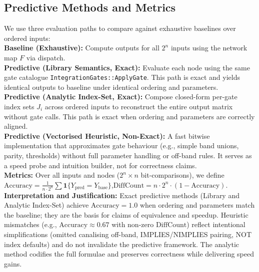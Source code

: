\documentclass{article}
\begin{document}
\subsection{Predictive Methods and Metrics}
We use three evaluation paths to compare against exhaustive baselines over ordered inputs:\\
\textbf{Baseline (Exhaustive):} Compute outputs for all \(2^n\) inputs using the network map \(F\) via dispatch.\\
\textbf{Predictive (Library Semantics, Exact):} Evaluate each node using the same gate catalogue \texttt{Integration\textasciigrave Gates::ApplyGate}. This path is exact and yields identical outputs to baseline under identical ordering and parameters.\\
\textbf{Predictive (Analytic Index-Set, Exact):} Compose closed-form per-gate index sets \(J_i\) across ordered inputs to reconstruct the entire output matrix without gate calls. This path is exact when ordering and parameters are correctly aligned.\\
\textbf{Predictive (Vectorised Heuristic, Non-Exact):} A fast bitwise implementation that approximates gate behaviour (e.g., simple band unions, parity, thresholds) without full parameter handling or off-band rules. It serves as a speed probe and intuition builder, not for correctness claims.\\
\textbf{Metrics:} Over all inputs and nodes (\(2^n\times n\) bit-comparisons), we define\\
\(\mathrm{Accuracy}=\frac{1}{n\cdot 2^n}\sum \mathbf{1}\{Y_{\mathrm{pred}}=Y_{\mathrm{base}}\}\),\quad \(\mathrm{DiffCount}=n\cdot 2^n \cdot (1-\mathrm{Accuracy})\).\\
\textbf{Interpretation and Justification:} Exact predictive methods (Library and Analytic Index-Set) achieve \(\mathrm{Accuracy}=1.0\) when ordering and parameters match the baseline; they are the basis for claims of equivalence and speedup. Heuristic mismatches (e.g., \(\mathrm{Accuracy}\approx 0.67\) with non-zero \(\mathrm{DiffCount}\)) reflect intentional simplifications (omitted canalising off-band, IMPLIES/NIMPLIES pairing, NOT index defaults) and do not invalidate the predictive framework. The analytic method codifies the full formulae and preserves correctness while delivering speed gains.\\
\end{document}
